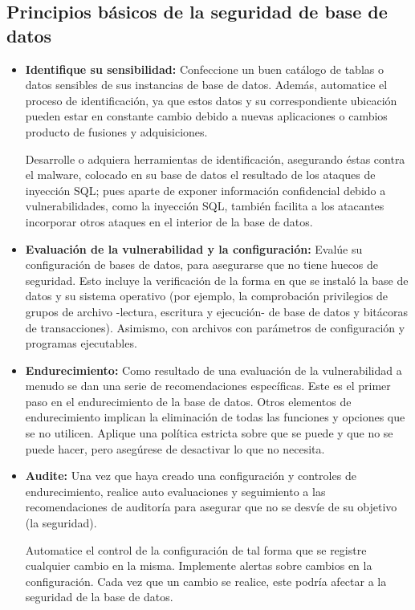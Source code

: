 \documentclass[%
 reprint,
 amsmath,amssymb,
 aps,
]{revtex4-1}
\begin{document}
\subsection{Principios básicos de la seguridad de base de datos}
\begin{itemize}
	\item \textbf{Identifique su sensibilidad: }Confeccione un buen catálogo de tablas o datos sensibles de sus instancias de base de datos. Además, automatice el proceso de identificación, ya que estos datos y su correspondiente ubicación pueden estar en constante cambio debido a nuevas aplicaciones o cambios producto de fusiones y adquisiciones.
	\par Desarrolle o adquiera herramientas de identificación, asegurando éstas contra el malware, colocado en su base de datos el resultado de los ataques de inyección SQL; pues aparte de exponer información confidencial debido a vulnerabilidades, como la inyección SQL, también facilita a los atacantes incorporar otros ataques en el interior de la base de datos.
	\item \textbf{Evaluación de la vulnerabilidad y la configuración: }Evalúe su configuración de bases de datos, para asegurarse que no tiene huecos de seguridad.
Esto incluye la verificación de la forma en que se instaló la base de datos y su sistema operativo (por ejemplo, la comprobación privilegios de grupos de archivo -lectura, escritura y ejecución- de base de datos y bitácoras de transacciones). Asimismo, con archivos con parámetros de configuración y programas ejecutables.
	\item \textbf{Endurecimiento: }Como resultado de una evaluación de la vulnerabilidad a menudo se dan una serie de recomendaciones específicas. Este es el primer paso en el endurecimiento de la base de datos. Otros elementos de endurecimiento implican la eliminación de todas las funciones y opciones que se no utilicen. Aplique una política estricta sobre que se puede y que no se puede hacer, pero asegúrese de desactivar lo que no necesita.
	\item \textbf{Audite: }Una vez que haya creado una configuración y controles de endurecimiento, realice auto evaluaciones y seguimiento a las recomendaciones de auditoría para asegurar que no se desvíe de su objetivo (la seguridad).
\par Automatice el control de la configuración de tal forma que se registre cualquier cambio en la misma. Implemente alertas sobre cambios en la configuración. Cada vez que un cambio se realice, este podría afectar a la seguridad de la base de datos.

\end{itemize}
\end{document}
